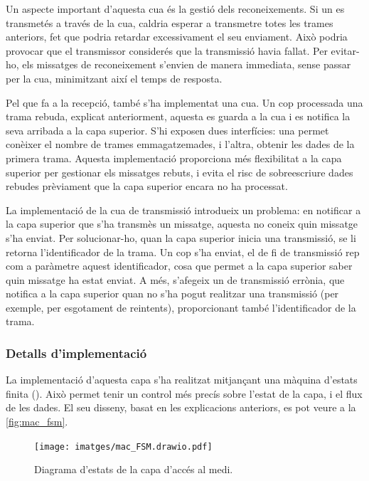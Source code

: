 \documentclass{tfgitic}[2024/07/01]
\begin{document}
Un aspecte important d'aquesta cua és la gestió dels reconeixements. Si un  es transmetés a través de la cua, caldria esperar a transmetre totes les trames anteriors, fet que podria retardar excessivament el seu enviament. Això podria provocar que el transmissor considerés que la transmissió havia fallat. Per evitar-ho, els missatges de reconeixement s'envien de manera immediata, sense passar per la cua, minimitzant així el temps de resposta.

Pel que fa a la recepció, també s'ha implementat una cua. Un cop processada una trama rebuda, explicat anteriorment, aquesta es guarda a la cua i es notifica la seva arribada a la capa superior. S'hi exposen dues interfícies: una permet conèixer el nombre de trames emmagatzemades, i l'altra, obtenir les dades de la primera trama. Aquesta implementació proporciona més flexibilitat a la capa superior per gestionar els missatges rebuts, i evita el risc de sobreescriure dades rebudes prèviament que la capa superior encara no ha processat.

La implementació de la cua de transmissió introdueix un problema: en notificar a la capa superior que s'ha transmès un missatge, aquesta no coneix quin missatge s'ha enviat. Per solucionar-ho, quan la capa superior inicia una transmissió, se li retorna l'identificador de la trama. Un cop s'ha enviat, el  de fi de transmissió rep com a paràmetre aquest identificador, cosa que permet a la capa superior saber quin missatge ha estat enviat. A més, s'afegeix un  de transmissió errònia, que notifica a la capa superior quan no s'ha pogut realitzar una transmissió (per exemple, per esgotament de reintents), proporcionant també l'identificador de la trama.
\subsubsection{Detalls d'implementació}
La implementació d'aquesta capa s'ha realitzat mitjançant una màquina d'estats finita (). Això permet tenir un control més precís sobre l'estat de la capa, i el flux de les dades. El seu disseny, basat en les explicacions anteriors, es pot veure a la \autoref{fig:mac_fsm}.

\begin{figure}
    \centering
    \texttt{[image: imatges/mac\_FSM.drawio.pdf]}
    \caption{Diagrama d'estats de la capa d'accés al medi.}
    \label{fig:mac_fsm}
\end{figure}
\end{document}
